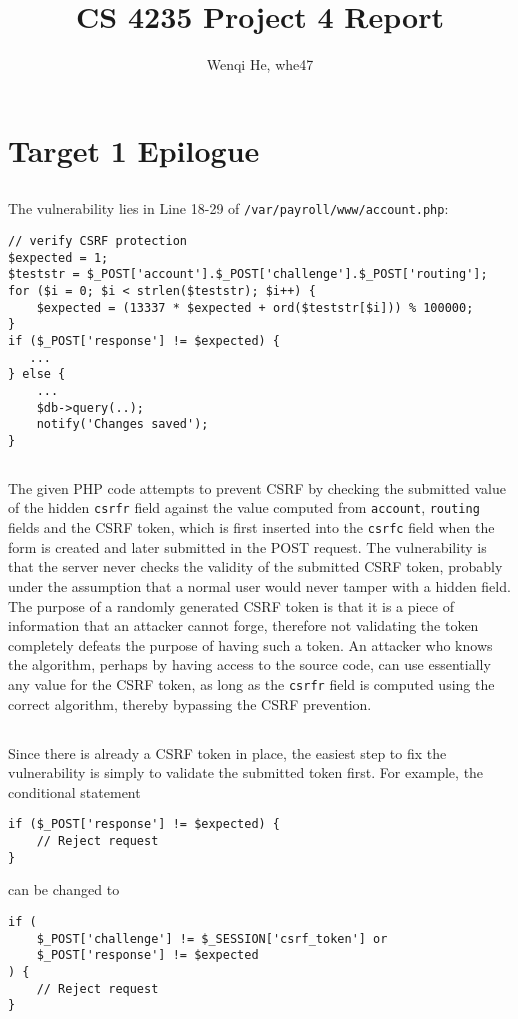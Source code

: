 \documentclass[11pt]{article}
\title{CS 4235 Project 4 Report}
\author{Wenqi He, whe47}
\begin{document}
\maketitle
\section{Target 1 Epilogue}
\subsection{}
The vulnerability lies in Line 18-29 of \texttt{/var/payroll/www/account.php}:
\begin{verbatim}
// verify CSRF protection
$expected = 1;
$teststr = $_POST['account'].$_POST['challenge'].$_POST['routing'];
for ($i = 0; $i < strlen($teststr); $i++) {
    $expected = (13337 * $expected + ord($teststr[$i])) % 100000;
}
if ($_POST['response'] != $expected) {
   ...
} else {
    ...
    $db->query(..);
    notify('Changes saved');
}
\end{verbatim}

\subsection{}
The given PHP code attempts to prevent CSRF by checking the submitted value of the hidden \texttt{csrfr} field against the value computed from \texttt{account}, \texttt{routing} fields and the CSRF token, which is first inserted into the \texttt{csrfc} field when the form is created and later submitted in the POST request. The vulnerability is that the server never checks the validity of the submitted CSRF token, probably under the assumption that a normal user would never tamper with a hidden field. The purpose of a randomly generated CSRF token is that it is a piece of information that an attacker cannot forge, therefore not validating the token completely defeats the purpose of having such a token. An attacker who knows the algorithm, perhaps by having access to the source code, can use essentially any value for the CSRF token, as long as the \texttt{csrfr} field is computed using the correct algorithm, thereby bypassing the CSRF prevention.

\subsection{}
Since there is already a CSRF token in place, the easiest step to fix the vulnerability is simply to validate the submitted token first. For example, the conditional statement
\begin{verbatim}
if ($_POST['response'] != $expected) {
    // Reject request
}
\end{verbatim}
can be changed to
\begin{verbatim}
if (
    $_POST['challenge'] != $_SESSION['csrf_token'] or 
    $_POST['response'] != $expected
) {
    // Reject request
}
\end{verbatim}
\end{document}
